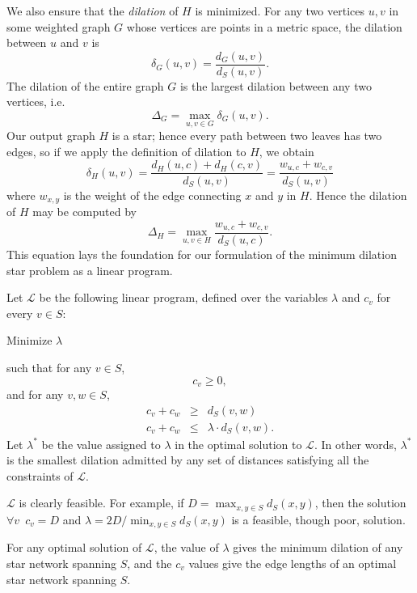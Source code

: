 \documentclass{llncs}
\begin{document}
We also ensure that the \emph{dilation} of $H$ is minimized.  For any two vertices $u,v$ in some weighted graph $G$ whose vertices are points in a metric space, the dilation between $u$ and $v$ is
\[ \delta_G(u,v) = \frac{d_G(u,v)}{d_S(u,v)} .\]
\noindent The dilation of the entire graph $G$ is the largest dilation between any two vertices, i.e.
\[ \Delta_G = \max_{u,v \in G} \delta_G(u,v) . \]
Our output graph $H$ is a star; hence every path between two leaves has two edges, so if we apply the definition of dilation to $H$, we obtain
\[ \delta_{H}(u,v) = \frac{d_{H}(u,c) + d_{H}(c,v)}{d_S(u,v)} = \frac{w_{u,c} + w_{c,v}}{d_S(u,v)} \]
\noindent where $w_{x,y}$ is the weight of the edge connecting $x$ and $y$ in $H$.  Hence the dilation of $H$ may be computed by
\[ \Delta_{H} = \max_{u,v \in H} \frac{w_{u,c} + w_{c,v}}{d_S(u,c)} .\]
\noindent This equation lays the foundation for our formulation of the minimum dilation star problem as a linear program.

\begin{definition}
\label{definition:L}
Let $\mathcal{L}$ be the following linear program, defined over the variables $\lambda$ and $c_v$ for every $v \in S$:

\begin{center}
\noindent Minimize $\lambda$
\end{center}
\noindent such that for any $v \in S$,
\begin{equation}
\label{equation:distance_nonzero}
c_v \geq 0 ,
\end{equation}
\noindent and for any $v,w \in S$,
\begin{eqnarray}
\label{equation:distance_triangle}c_v + c_w & \geq & d_S(v,w) \\ 
\label{equation:distance_dilation}c_v + c_w & \leq & \lambda \cdot d_S(v,w) .
\end{eqnarray}
\noindent Let $\lambda^*$ be the value assigned to $\lambda$ in the optimal solution to $\mathcal{L}$.  In other words, $\lambda^*$ is the smallest dilation admitted by any set of distances satisfying all the constraints of $\mathcal{L}$.
\end{definition}

\noindent $\mathcal{L}$ is clearly feasible.  For example, if $D=\max_{x,y \in S} d_S(x,y)$, then the solution $\forall v \enspace c_v=D$ and $\lambda=2D/\min_{x,y \in S} d_S(x,y)$ is a feasible, though poor, solution.

\begin{lemma}
For any optimal solution of $\mathcal{L}$, the value of $\lambda$ gives the minimum dilation of any star network spanning $S$, and the $c_v$ values give the edge lengths of an optimal star network spanning $S$.
\end{lemma}
\end{document}
